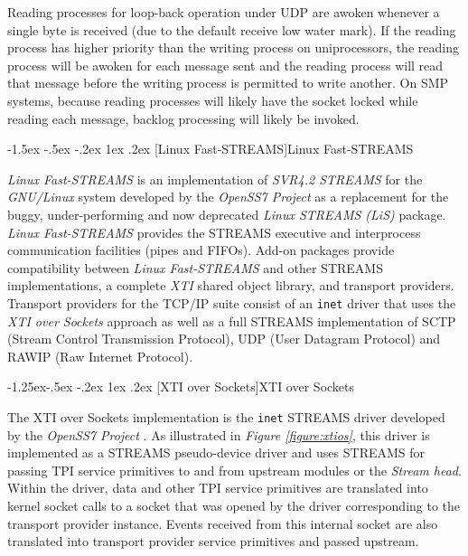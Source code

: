 \documentclass[letterpaper,final,notitlepage,twocolumn,10pt,twoside]{article}
\makeatletter
\renewcommand\subsection{\@startsection{subsection}{2}{\z@}%
                                     {-1.5ex \@plus -.5ex \@minus -.2ex}%
                                     {1ex \@plus .2ex}%
                                     {\normalfont\normalsize\bfseries}}
\renewcommand\subsubsection{\@startsection{subsubsection}{3}{\z@}%
                                     {-1.25ex\@plus -.5ex \@minus -.2ex}%
                                     {1ex \@plus .2ex}%
                                     {\normalfont\normalsize\bfseries}}
\makeatother
\begin{document}
Reading processes for loop-back operation under UDP are awoken whenever a single byte is received
(due to the default receive low water mark).  If the reading process has higher priority than the
writing process on uniprocessors, the reading process will be awoken for each message sent and the
reading process will read that message before the writing process is permitted to write another.  On
SMP systems, because reading processes will likely have the socket locked while reading each
message, backlog processing will likely be invoked.

\subsection[Linux Fast-STREAMS]{Linux Fast-STREAMS}

\textsl{Linux Fast-STREAMS} is an implementation of \textsl{SVR4.2 STREAMS} for the
\textsl{GNU/Linux} system developed by the \textsl{OpenSS7 Project} \cite[]{openss7} as a
replacement for the buggy, under-performing and now deprecated \textsl{Linux STREAMS (LiS)} package.
\textsl{Linux Fast-STREAMS} provides the STREAMS executive and interprocess communication facilities
(pipes and FIFOs).  Add-on packages provide compatibility between \textsl{Linux Fast-STREAMS} and
other STREAMS implementations, a complete \textsl{XTI} shared object library, and transport
providers.  Transport providers for the TCP/IP suite consist of an \texttt{inet} driver that uses
the \textit{XTI over Sockets} approach as well as a full STREAMS implementation of SCTP (Stream
Control Transmission Protocol), UDP (User Datagram Protocol) and RAWIP (Raw Internet Protocol).

\subsubsection[XTI over Sockets]{XTI over Sockets}
\label{section:xtios}

The XTI over Sockets implementation is the \texttt{inet} STREAMS driver developed by the
\textsl{OpenSS7 Project} \cite[]{openss7}. As illustrated in \textit{Figure \ref{figure:xtios}},
this driver is implemented as a STREAMS pseudo-device driver and uses STREAMS for passing TPI
service primitives to and from upstream modules or the \textit{Stream head}.  Within the driver,
data and other TPI service primitives are translated into kernel socket calls to a socket that was
opened by the driver corresponding to the transport provider instance.  Events received from this
internal socket are also translated into transport provider service primitives and passed upstream.
\end{document}
